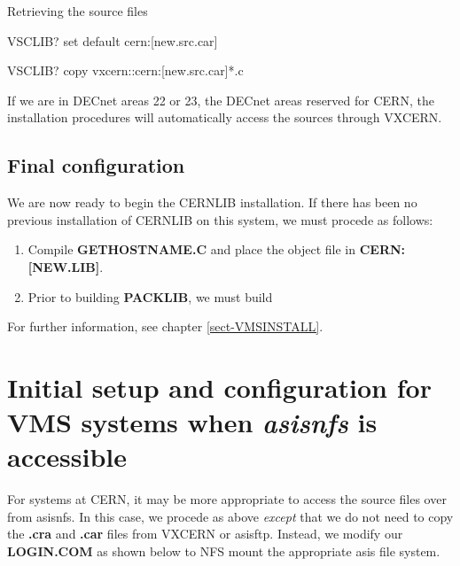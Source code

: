 \begin{XMPt}{Retrieving the source files}

VSCLIB? set default cern:[new.src.car]

VSCLIB? copy vxcern::cern:[new.src.car]*.c%

\end{XMPt}

If we are in DECnet areas 22 or 23, the DECnet areas
reserved for CERN, the installation procedures
will automatically access the sources through VXCERN.

\section{Final configuration}

We are now ready to begin the CERNLIB installation.
If there has been no previous installation of CERNLIB
on this system, we must procede as follows:


\begin{enumerate}
\item
Compile {\bf GETHOSTNAME.C} and place the object file in
{\bf CERN:[NEW.LIB]}.
\item
Prior to building {\bf PACKLIB}, we must build
\end{enumerate}

For further information, see chapter \ref{sect-VMSINSTALL}.

\chapter{Initial setup and configuration for VMS systems when {\it asisnfs} is accessible}

For systems at CERN, it may be more appropriate to access the source
files over \NFS{} from asisnfs. In this case, we procede as above
{\it except} that we do not need to copy the {\bf .cra} and {\bf .car}
files from VXCERN or asisftp. Instead, we modify our {\bf LOGIN.COM}
as shown below to NFS mount the appropriate asis file system.

